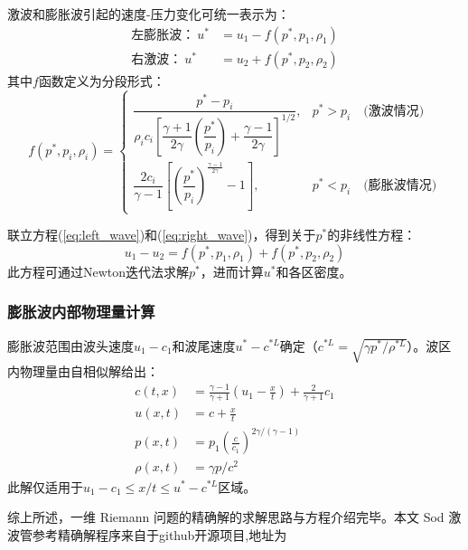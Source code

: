 \documentclass[12pt,a4paper]{article}
\begin{document}
激波和膨胀波引起的速度-压力变化可统一表示为：
\begin{align}
\text{左膨胀波：}\ u^{*} &= u_{1} - f\left(p^{*}, p_{1},\rho_{1}\right) \label{eq:left_wave} \\
\text{右激波：}\ u^{*} &= u_{2} + f\left(p^{*}, p_{2},\rho_{2}\right) \label{eq:right_wave}
\end{align}
其中$f$函数定义为分段形式：
\begin{equation}
f\left(p^{*}, p_{i}, \rho_{i}\right)=\left\{\begin{array}{ll}
\dfrac{p^{*}-p_{i}}{\rho_{i} c_{i}\left[\dfrac{\gamma+1}{2\gamma}\left(\dfrac{p^{*}}{p_{i}}\right)+\dfrac{\gamma-1}{2\gamma}\right]^{1/2}}, & p^{*}>p_{i} \quad \text{(激波情况)} \\
\dfrac{2c_{i}}{\gamma-1}\left[\left(\dfrac{p^{*}}{p_{i}}\right)^{\frac{\gamma-1}{2\gamma}}-1\right], & p^{*}<p_{i} \quad \text{(膨胀波情况)}
\end{array}\right. \label{eq:f_function}
\end{equation}

联立方程(\ref{eq:left_wave})和(\ref{eq:right_wave})，得到关于$p^*$的非线性方程：
\begin{equation}
u_{1} - u_{2} = f\left(p^{*}, p_{1},\rho_{1}\right) + f\left(p^{*}, p_{2},\rho_{2}\right) \label{eq:p_star_eq}
\end{equation}
此方程可通过Newton迭代法求解$p^*$，进而计算$u^*$和各区密度。

\subsubsection{膨胀波内部物理量计算}
膨胀波范围由波头速度$u_{1}-c_{1}$和波尾速度$u^{*}-c^{*L}$确定（$c^{*L} = \sqrt{\gamma p^{*}/\rho^{*L}}$）。波区内物理量由自相似解给出：
\begin{align}
c(t,x) &= \frac{\gamma-1}{\gamma+1}\left(u_{1}-\frac{x}{t}\right)+\frac{2}{\gamma+1}c_{1} \label{eq:c_expansion} \\
u(x,t) &= c + \frac{x}{t} \label{eq:u_expansion} \\
p(x,t) &= p_{1}\left(\frac{c}{c_{1}}\right)^{2\gamma/(\gamma-1)} \label{eq:p_expansion} \\
\rho(x,t) &= \gamma p / c^{2} \label{eq:rho_expansion}
\end{align}
此解仅适用于$u_1 - c_1 \leq x/t \leq u^* - c^{*L}$区域。

综上所述，一维 Riemann 问题的精确解的求解思路与方程介绍完毕。本文 Sod 激波管参考精确解程序来自于github开源项目,地址为
\end{document}
